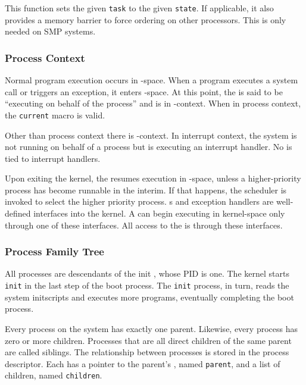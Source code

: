 This function sets the given \texttt{task} to the given \texttt{state}.
If applicable, it also provides a memory barrier to force ordering on other processors.
This is only needed on SMP systems.

\subsubsection{Process Context}\label{subsubsec:Process_Context}
Normal program execution occurs in -space.
When a program executes a system call or triggers an exception, it enters -space.
At this point, the  is said to be ``executing on behalf of the process'' and is in -context.
When in process context, the \texttt{current} macro is valid.

\begin{remark*}
  Other than process context there is -context.
  In interrupt context, the system is not running on behalf of a process but is executing an interrupt handler.
  No  is tied to interrupt handlers.
\end{remark*}

Upon exiting the kernel, the  resumes execution in -space, unless a higher-priority process has become runnable in the interim.
If that happens, the scheduler is invoked to select the higher priority process.
s and exception handlers are well-defined interfaces into the kernel.
A  can begin executing in kernel-space only through one of these interfaces.
All access to the  is through these interfaces.

\subsubsection{Process Family Tree}\label{subsubsec:Process_Family_Tree}
All processes are descendants of the init , whose PID is one.
The kernel starts \texttt{init} in the last step of the boot process.
The \texttt{init} process, in turn, reads the system initscripts and executes more programs, eventually completing the boot process.

Every process on the system has exactly one parent.
Likewise, every process has zero or more children.
Processes that are all direct children of the same parent are called siblings.
The relationship between processes is stored in the process descriptor.
Each  has a pointer to the parent’s , named \texttt{parent}, and a list of children, named \texttt{children}.

